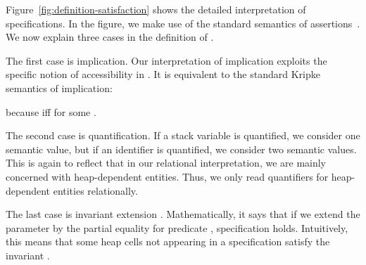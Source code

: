 \documentclass{LMCS}
\begin{document}
Figure~\ref{fig:definition-satisfaction} shows
the detailed interpretation of specifications. 
In the figure, we make use of the standard semantics of 
assertions~\cite{reynolds02}.
We now explain three cases in the definition of .


The first case is implication.
Our interpretation of implication exploits the
specific notion of accessibility in .  It is
equivalent to the standard Kripke semantics of implication:

because  iff  for some .

The second case is quantification. If a stack
variable  is quantified, we consider one semantic value, but
if an identifier  is quantified, we consider two semantic 
values. This is again to reflect that in
our relational interpretation, we are mainly concerned with 
heap-dependent entities. Thus, we only read quantifiers for 
heap-dependent entities  relationally.

The last case is invariant extension 
. Mathematically, it says that if we extend the 
 parameter by the partial equality for
predicate , specification  holds. Intuitively,
this means that some heap cells not appearing in a specification  
satisfy the invariant .
\end{document}
